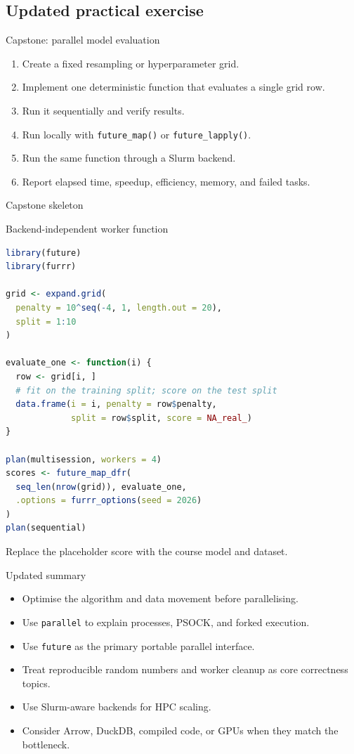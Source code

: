 \subsection{Updated practical exercise}

\begin{frame}{Capstone: parallel model evaluation}
\begin{enumerate}
  \item Create a fixed resampling or hyperparameter grid.
  \item Implement one deterministic function that evaluates a single grid row.
  \item Run it sequentially and verify results.
  \item Run locally with \texttt{future\_map()} or \texttt{future\_lapply()}.
  \item Run the same function through a Slurm backend.
  \item Report elapsed time, speedup, efficiency, memory, and failed tasks.
\end{enumerate}
\end{frame}

\begin{frame}[fragile]{Capstone skeleton}
\begin{block}{Backend-independent worker function}
\begin{lstlisting}[language=R]
library(future)
library(furrr)

grid <- expand.grid(
  penalty = 10^seq(-4, 1, length.out = 20),
  split = 1:10
)

evaluate_one <- function(i) {
  row <- grid[i, ]
  # fit on the training split; score on the test split
  data.frame(i = i, penalty = row$penalty,
             split = row$split, score = NA_real_)
}

plan(multisession, workers = 4)
scores <- future_map_dfr(
  seq_len(nrow(grid)), evaluate_one,
  .options = furrr_options(seed = 2026)
)
plan(sequential)
\end{lstlisting}
\end{block}
Replace the placeholder score with the course model and dataset.
\end{frame}

\begin{frame}{Updated summary}
\begin{itemize}
  \item Optimise the algorithm and data movement before parallelising.
  \item Use \texttt{parallel} to explain processes, PSOCK, and forked execution.
  \item Use \texttt{future} as the primary portable parallel interface.
  \item Treat reproducible random numbers and worker cleanup as core correctness topics.
  \item Use Slurm-aware backends for HPC scaling.
  \item Consider Arrow, DuckDB, compiled code, or GPUs when they match the bottleneck.
\end{itemize}
\end{frame}

